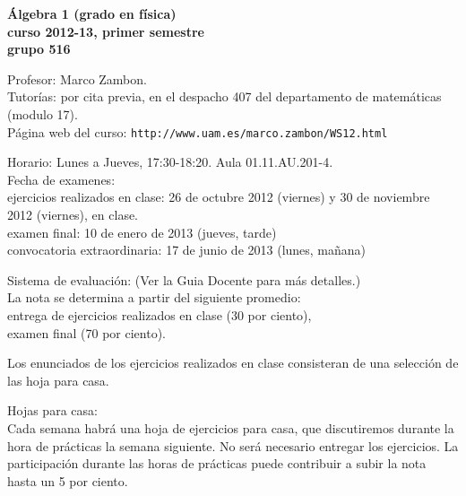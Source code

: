 \documentclass[12pt,a4paper]{amsart}
\begin{document}
\thispagestyle{empty}
\vspace*{-2cm}

 
\noindent
\begin{center}\Large\bfseries\textsf{\'Algebra 1 (grado en f\'isica)\\   curso 2012-13, primer semestre\\
	grupo 516}
\end{center}
\hrulefill{}
 
\noindent
{\sffamily    
Profesor:} Marco Zambon. \\
{\sffamily Tutor\'ias:} por cita previa, en el despacho 407 del departamento de matem\'aticas (modulo 17). \\
{\sffamily P\'agina web del curso:} \texttt{http://www.uam.es/marco.zambon/WS12.html}

\noindent\hrulefill{}  

\noindent
{\sffamily Horario:} Lunes a Jueves, 17:30-18:20. Aula  01.11.AU.201-4.   \\ 
\noindent
{\sffamily  Fecha de examenes:} \\ 
ejercicios realizados en clase: 26 de octubre 2012 (viernes) y
 30 de noviembre 2012 (viernes), en clase.\\ 
examen final: 10 de enero de 2013 (jueves, tarde)\\
convocatoria extraordinaria:  17 de junio de 2013 (lunes, ma\~nana) 

\noindent\hrulefill{}  

\noindent
{\sffamily  Sistema de evaluaci\'on:}  (Ver la Guia Docente para m\'as detalles.)\\
La nota se determina a partir del siguiente promedio:\\
entrega de ejercicios realizados en clase (30 por ciento),\\
examen final (70 por ciento).

Los enunciados de los ejercicios realizados en clase consisteran de una selecci\'on de las hoja   para casa.

\noindent\hrulefill{}  

\noindent
{\sffamily  Hojas para casa:}\\
Cada  semana habr\'a una hoja de ejercicios para casa, que discutiremos durante la hora de pr\'acticas la semana siguiente. No ser\'a necesario entregar los ejercicios.
La participaci\'on durante las horas de pr\'acticas puede contribuir a subir la nota hasta un 5 por ciento.
\end{document}
